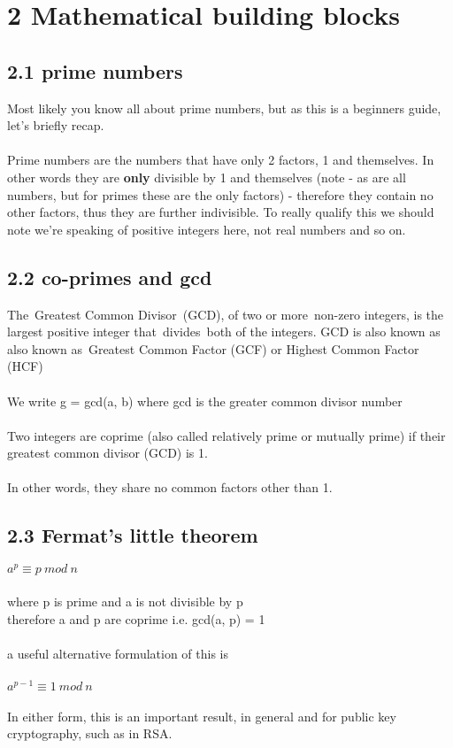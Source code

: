 \documentclass[11pt]{article}   	%
\begin{document}
\break 


\section*{2 Mathematical building blocks}

\subsection*{2.1 prime numbers}

Most likely you know all about prime numbers, but as this is a beginners guide, let's briefly recap. \\
\\
Prime numbers are the numbers that have only 2 factors, 1 and themselves. In other words they are \textbf{only} divisible by 1 and themselves (note - as are all numbers, but for primes these are the only factors) - therefore they contain no other factors, thus they are further indivisible. To really qualify this we should note we're speaking of positive integers here, not real numbers and so on.


\subsection*{2.2 co-primes and gcd}

The Greatest Common Divisor (GCD), of two or more non-zero integers, is the largest positive integer that divides both of the integers. GCD is also known as also known as Greatest Common Factor (GCF) or Highest Common Factor (HCF) \\
\\
We write g = gcd(a, b) where gcd is the greater common divisor number \\
\\
Two integers are coprime (also called relatively prime or mutually prime) if their greatest common divisor (GCD) is 1. \\
\\
In other words, they share no common factors other than 1.


\subsection*{2.3 Fermat’s little theorem}

\boldmath $ a^p \equiv p \ mod \ n $ \unboldmath \\
\\
where p is prime and a is not divisible by p \\
therefore a and p are coprime i.e. gcd(a, p) = 1 \\
\\
a useful alternative formulation of this is \\
\\
$ a^{p-1} \equiv 1 \ mod \ n $ \\
\\
In either form, this is an important result, in general and for public key cryptography, such as in RSA.
\end{document}
